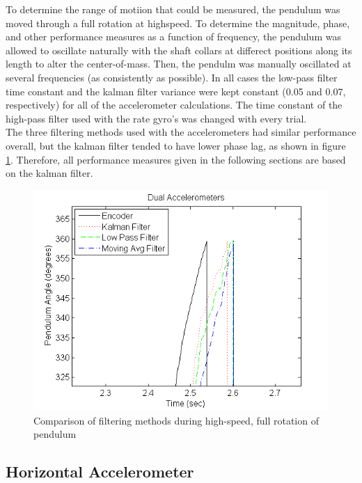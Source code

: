 \documentclass{article}
\theoremstyle{plain}
\theoremstyle{definition}
\theoremstyle{remark}
\begin{document}
To determine the range of motiion that could be measured, the pendulum was moved through a full rotation at highspeed. To determine the magnitude, phase, and other performance measures as a function of frequency, the pendulum was allowed to oscillate naturally with the shaft collars at differect positions along its length to alter the center-of-mass. Then, the pendulm was manually oscillated at several frequencies (as consistently as possible). In all cases the low-pass filter time constant and the kalman filter variance were kept constant (0.05 and 0.07, respectively) for all of the accelerometer calculations. The time constant of the high-pass filter used with the rate gyro's was changed with every trial.\\  

The three filtering methods used with the accelerometers had similar performance overall, but the kalman filter tended to have lower phase lag, as shown in figure \ref{kalman_lag}. Therefore, all performance measures given in the following sections are based on the kalman filter.\\

\begin{figure}[hbt]
\begin{center}
\includegraphics[width = 12cm]{Example_Kalman_Lag.png}
\caption{Comparison of filtering methods during high-speed, full rotation of pendulum}
\label{kalman_lag}
\end{center}
\end{figure}

\subsection{Horizontal Accelerometer}
\end{document}
